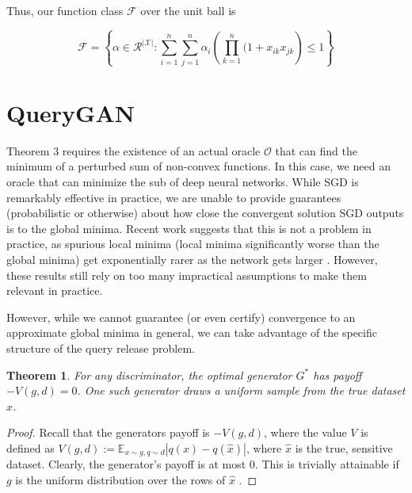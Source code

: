 \documentclass[]{article}
\newcommand{\X}{\mathcal{X}}
\newtheorem{theorem}{Theorem}[section]
\theoremstyle{definition}
\begin{document}
Thus, our function class $\mathcal{F}$ over the unit ball is 


\begin{equation}
    \mathcal{F} = \left\{\alpha \in \mathcal{R}^{|\X|} : \sum_{i = 1}^n \sum_{j=1}^n \alpha_i \left(\prod_{k=1}^n (1+ x_{ik}x_{jk}\right) \leq 1 \right\}
\end{equation}


\section{QueryGAN}

Theorem 3 requires the existence of an actual oracle $\mathcal{O}$ that can find the minimum of a perturbed sum of non-convex functions. In this case, we need an oracle that can minimize the sub of deep neural networks. While SGD is remarkably effective in practice, we are unable to provide guarantees (probabilistic or otherwise) about how close the convergent solution SGD outputs is to the global minima. Recent work suggests that this is not a problem in practice, as spurious local minima (local minima significantly worse than the global minima) get exponentially rarer as the network gets larger \cite{CHM+14}. However, these results still rely on too many impractical assumptions to make them relevant in practice. 

However, while we cannot guarantee (or even certify) convergence to an approximate global minima in general, we can take advantage of the specific structure of the query release problem. 

\begin{theorem}
    For any discriminator, the optimal generator $G^*$ has payoff $-V(g,d) = 0$. One such generator draws a uniform sample from the true dataset $\hat x$. 
\end{theorem}
\begin{proof}
    Recall that the generators payoff is  $-V(g,d)$, where the value $V$ is defined as $V(g,d) := \mathbb{E}_{x \sim g, q \sim d} |q(x) - q(\hat x)|$, where $\hat x$ is the true, sensitive dataset. Clearly, the generator's payoff is at most $0$. This is trivially attainable if $g$ is the uniform distribution over the rows of $\hat x$ .
\end{proof}
\end{document}
